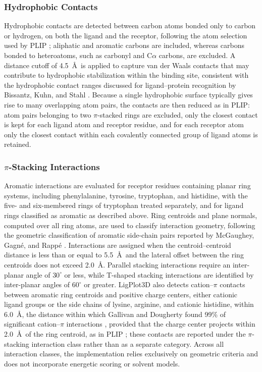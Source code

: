 \documentclass[journal=jacsat,manuscript=article]{achemso}
\begin{document}
\subsubsection{Hydrophobic Contacts}
Hydrophobic contacts are detected between carbon atoms bonded only to carbon or hydrogen, on both the ligand and the receptor, following the atom selection used by PLIP \cite{salentin2015plip}; aliphatic and aromatic carbons are included, whereas carbons bonded to heteroatoms, such as carbonyl and C$\alpha$ carbons, are excluded. A distance cutoff of 4.5~\AA\ is applied to capture van der Waals contacts that may contribute to hydrophobic stabilization within the binding site, consistent with the hydrophobic contact ranges discussed for ligand--protein recognition by Bissantz, Kuhn, and Stahl \cite{bissantz2010medicinal}. Because a single hydrophobic surface typically gives rise to many overlapping atom pairs, the contacts are then reduced as in PLIP: atom pairs belonging to two $\pi$-stacked rings are excluded, only the closest contact is kept for each ligand atom and receptor residue, and for each receptor atom only the closest contact within each covalently connected group of ligand atoms is retained.


\subsubsection{$\pi$-Stacking Interactions}
Aromatic interactions are evaluated for receptor residues containing planar ring systems, including phenylalanine, tyrosine, tryptophan, and histidine, with the five- and six-membered rings of tryptophan treated separately, and for ligand rings classified as aromatic as described above. Ring centroids and plane normals, computed over all ring atoms, are used to classify interaction geometry, following the geometric classification of aromatic side-chain pairs reported by McGaughey, Gagn\'e, and Rapp\'e \cite{mcgaughey1998pi}. Interactions are assigned when the centroid–centroid distance is less than or equal to 5.5~\AA\ and the lateral offset between the ring centroids does not exceed 2.0~\AA. Parallel stacking interactions require an inter-planar angle of $30^{\circ}$ or less, while T-shaped stacking interactions are identified by inter-planar angles of $60^{\circ}$ or greater. LigPlot3D also detects cation–$\pi$ contacts between aromatic ring centroids and positive charge centers, either cationic ligand groups or the side chains of lysine, arginine, and cationic histidine, within 6.0~\AA, the distance within which Gallivan and Dougherty found 99\% of significant cation–$\pi$ interactions \cite{gallivan1999cation}, provided that the charge center projects within 2.0~\AA\ of the ring centroid, as in PLIP \cite{salentin2015plip}; these contacts are reported under the $\pi$-stacking interaction class rather than as a separate category. Across all interaction classes, the implementation relies exclusively on geometric criteria and does not incorporate energetic scoring or solvent models.
\end{document}
